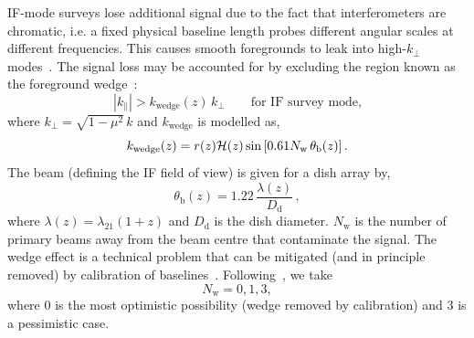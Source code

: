 IF-mode surveys lose additional signal due to the fact that interferometers are chromatic, i.e. a fixed physical baseline length probes different angular scales at different frequencies. This causes smooth foregrounds to leak into high-$k_{\perp}$ modes~\cite{Obuljen:2017jiy,Alonso:2017dgh,Ansari:2018ury}. The signal loss may be accounted for by excluding
the region known as the foreground wedge~\cite{Pober:2014lva, Pober:2013jna}: 
\begin{equation} \label{e2.19}
\left|k_{\parallel}\right| > k_\mathrm{wedge}(z)\,k_{\perp} \qquad \mbox{for IF survey mode,}
\end{equation} 
where $k_\perp=\sqrt{1-\mu^2}\,k$ and $k_\mathrm{wedge}$ is modelled as,
\begin{equation}
k_\mathrm{wedge}(z) = r(z) \mathcal{H}(z) \sin{\left[0.61N_{\mathrm{w}}\,{\theta_\mathrm{b}(z)}\right]} \,. \label{e2.20} 
\end{equation}
The beam (defining the IF field of view) is given for a dish array by,
\begin{equation}\label{thetab}
\theta_\mathrm{b}(z) = 1.22 \,\frac{\lambda(z)}{D_\mathrm{d}}\,,
\end{equation}
where $\lambda(z)=\lambda_{21}(1+z)$ and $D_\mathrm{d}$ is the dish diameter.
$N_{\mathrm{w}}$ is the number of primary beams away from the beam centre that contaminate the signal. The wedge effect is a technical problem that can be mitigated (and  in principle removed) by calibration of baselines~\cite{Ghosh:2017woo}.
Following~\cite{Karagiannis:2019jjx}, we take
\begin{equation}
N_{\mathrm{w}}= 0, 1, 3, 
\end{equation}
where 0 is the most optimistic possibility (wedge removed by calibration) and 3 is a pessimistic case. 
%
